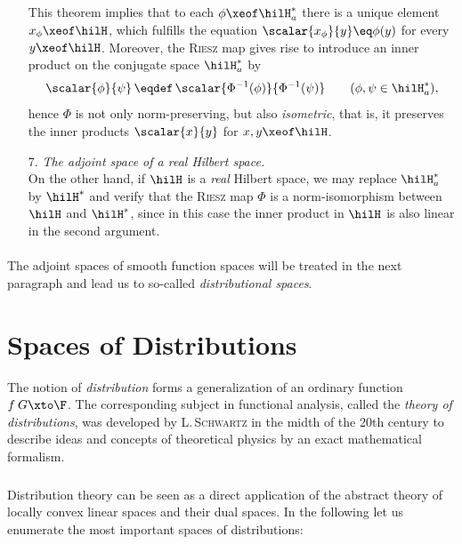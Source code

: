 \documentclass[11pt,twoside]{article}
\def\G{G}
\begin{document}
\begin{itemize}[leftmargin=12pt,itemsep=5pt]
\subparagraph{}
This theorem implies that
to each $\phi \xeof \hilH_a^*$
there is a unique element $x_{\phi} \xeof \hilH$,
which fulfills the equation
$\scalar{x_{\phi}}{y} \eq \phi(y)$ for every $y \xeof \hilH$.
Moreover,
the \textsc{Riesz} map gives rise to introduce an inner product
on the conjugate space $\hilH_a^*$ by
\[
\scalar{\phi}{\psi} \, \eqdef \, \scalar{\Phi^{-1}(\phi)}{\Phi^{-1}(\psi)}
\quad \quad (\phi,\psi \in \hilH_a^*),
\]
hence $\Phi$ is not only norm-preserving,
but also \textit{isometric},
that is,
it preserves the inner products $\scalar{x}{y}$ for $x,y \xeof \hilH$.

\item[7.] \textit{The adjoint space of a real Hilbert space.}\\
On the other hand,
if $\hilH$ is a \textit{real} Hilbert space,
we may replace $\hilH_a^*$ by $\hilH^*$ and verify
that the \textsc{Riesz} map $\Phi$ is a norm-isomorphism
between $\hilH$ and $\hilH^*$,
since in this case
the inner product in $\hilH$ is also linear in the second argument.
\end{itemize}

\paragraph{}
The adjoint spaces of smooth function spaces will be treated
in the next paragraph and lead us to so-called \textit{distributional spaces}.

\section{Spaces of Distributions}
The notion of \textit{distribution} forms a generalization
of an ordinary function $f\:\G \xto \F$.
The corresponding subject in functional analysis,
called the \textit{theory of distributions},
was developed by \textsc{L.\,Schwartz} in the midth of the 20th century
to describe ideas and concepts of theoretical physics
by an exact mathematical formalism.

\subparagraph{}
Distribution theory can be seen as a direct application
of the abstract theory of locally convex linear spaces and their dual spaces.
In the following let us enumerate the most important spaces of distributions:
\end{document}
